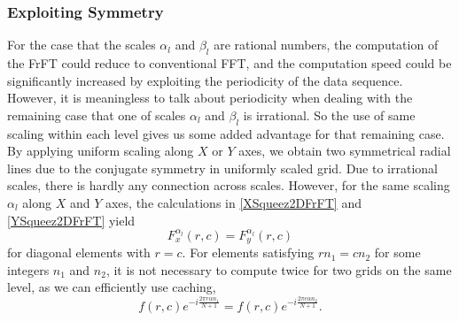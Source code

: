 \documentclass{UCF_ETD}
\begin{document}
 \subsubsection{Exploiting Symmetry}
  For the case that the scales $\alpha_l$ and $\beta_l$ are rational numbers,  the computation of the FrFT could  reduce to conventional FFT, and the computation speed could be significantly increased by exploiting the periodicity of the data sequence.
  However, it is meaningless to talk about periodicity when dealing with the remaining case that one of scales $\alpha_l$ and $\beta_l$ is  irrational. So  the use of same scaling within each level gives us some added advantage for that remaining case. By applying uniform scaling along $X$ or $Y$ axes, we obtain two symmetrical radial lines due to the conjugate symmetry in uniformly scaled grid.
  Due to  irrational scales, there is hardly any connection across scales. However, for the same scaling $\alpha_l$
   along $X$ and $Y$ axes, the calculations in \eqref{XSqueez2DFrFT} and  \eqref{YSqueez2DFrFT} yield
 \begin{equation} \label{DiagElements}
 F^{\alpha_l}_x (r,c) = F^{\alpha_l}_y (r,c)
 \end{equation}
   for diagonal elements with $r = c$.
   For elements satisfying $ r n_1 = c n_2$ for some integers $n_1$ and $n_2$,
  it is not necessary to compute twice %
  for two grids on the same level, as
   we can efficiently use  caching, %
 \begin{equation} \label{CommonElements}
 f(r,c) e^{-i\frac{2\pi r\alpha n_1}{N+1}} =   f(r,c) e^{-i\frac{2\pi c\alpha n_2}{N+1}}.
 \end{equation}
 
\end{document}
